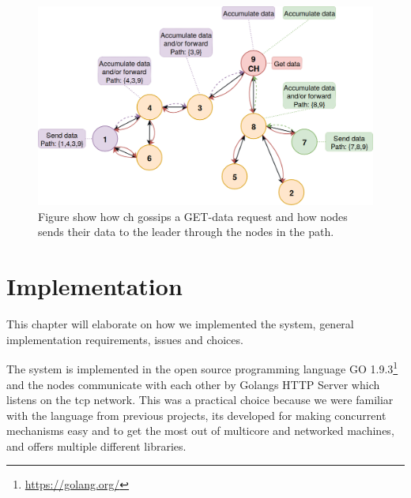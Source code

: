 \documentclass[USenglish]{uit-thesis}
\begin{document}

\begin{figure}
\centering
\includegraphics[width=\textwidth]{gatherSendData1.png}
\caption{Figure show how \gls{ch} gossips a GET-data request and how  nodes sends their data to the leader through the nodes in the path.}
\label{fig:gaterSendData}
\end{figure}



\chapter{Implementation}

This chapter will elaborate on how we implemented the system, general implementation requirements, issues and choices. 

The system is implemented in the open source programming language GO 1.9.3\footnote{\url{https://golang.org/}} and the nodes communicate with each other by Golangs HTTP Server which listens on the \gls{tcp} network. This was a practical choice because we were familiar with the language from previous projects, its developed for making concurrent mechanisms easy and to get the most out of multicore and networked machines, and offers multiple different libraries.
\end{document}

